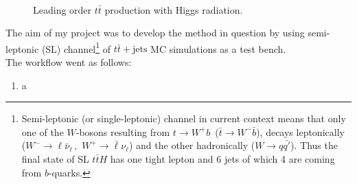 \documentclass[12pt,a4paper]{article}
\begin{document}
\begin{figure}[H]
	\begin{center}
	~~~~~~~~~~
	\caption{Leading order $t\bar{t}$ production with Higgs radiation.}
	\label{fig:ttH}
	\end{center}
\end{figure}

The aim of my project was to develop the method in question by using semi-leptonic (SL) channel\footnote{Semi-leptonic (or single-leptonic) channel in current context means that only one of the $W$-bosons resulting from $t\to W^+b\,$ ($\bar{t}\to W^-\bar{b}$), decays leptonically ($W^-\to \mathcal{\ell}\bar{\nu}_\mathcal{\ell}\,,\,\,W^+\to \bar{\mathcal{\ell}}\nu_\mathcal{\ell}$) and the other hadronically ($W\to q\bar{q'}$). Thus the final state of SL $t\bar{t}H$ has one tight lepton and 6 jets of which 4 are coming from $b$-quarks.}
of $t\bar{t}+\mbox{jets}$ MC simulations as a test bench.\\

\noindent The workflow went as follows:
\begin{enumerate}
\item a
\end{enumerate}
\end{document}
